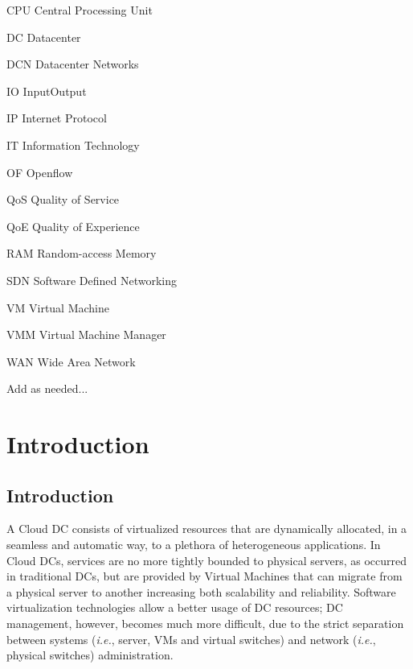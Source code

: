 \documentclass[12pt,english,oneside]{book}
\newenvironment{lyxlist}[1]
   {\begin{list}{}
     {\settowidth{\labelwidth}{#1}
      \setlength{\leftmargin}{\labelwidth}
      \addtolength{\leftmargin}{\labelsep}
      \renewcommand{\makelabel}[1]{##1\hfil}}}
   {\end{list}}
\begin{document}


\begin{lyxlist}{00.00.0000}
\begin{singlespace}
\item [CPU]Central Processing Unit
\item [DC]Datacenter
\item [DCN]Datacenter Networks
\item [IO]Input\/Output
\item [IP]Internet Protocol 
\item [IT]Information Technology
\item [OF]Openflow
\item [QoS] Quality of Service
\item [QoE] Quality of Experience
\item [RAM]Random-access Memory
\item [SDN]Software Defined Networking
\item [VM]Virtual Machine
\item [VMM]Virtual Machine Manager
\item [WAN] Wide Area Network
\item Add as needed...
\end{singlespace}
\end{lyxlist}


\listoffigures


\listoftables


\setcounter{page}{0}



\chapter{Introduction\label{cha:introduction}}

\section{Introduction}
\hspace{0.6cm}

A Cloud DC consists of virtualized resources that are dynamically allocated, in a seamless and automatic way, to a plethora of heterogeneous applications.
In Cloud DCs, services are no more tightly bounded to physical servers, as occurred in traditional DCs, but are provided by Virtual Machines that can migrate from a physical server to another increasing both scalability and reliability.
Software virtualization technologies allow a better usage of DC resources; DC management, however, becomes much more difficult, due to the strict separation between systems (\textit{i.e.}, server, VMs and virtual switches) and network (\textit{i.e.}, physical switches) administration.
\end{document}
